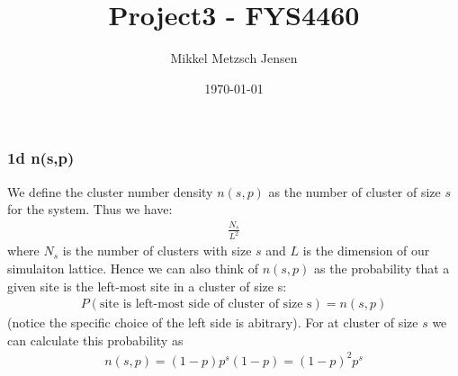 \documentclass[reprint, amsmath, amssymb, aps]{revtex4-2}
\begin{document}
\title{Project3 - FYS4460}
\author{Mikkel Metzsch Jensen}

\date{\today}
\maketitle
\subsubsection*{1d n(s,p)}
We define the cluster number density $n(s,p)$ as the number of cluster of size $s$ for the system. Thus we have:
\begin{align*}
  \frac{N_s}{L^2}
\end{align*}
where $N_s$ is the number of clusters with size $s$ and $L$ is the dimension of our simulaiton lattice. Hence we can also think of $n(s,p)$ as the probability that a given site is the left-most site in a cluster of size s:
\begin{align*}
  P(\text{site is left-most side of cluster of size s}) = n(s,p)
\end{align*}
(notice the specific choice of the left side is abitrary). For at cluster of size $s$ we can calculate this probability as
\begin{align*}
  n(s,p) = (1-p)p^s(1-p) = (1-p)^2p^s
\end{align*}

\end{document}
